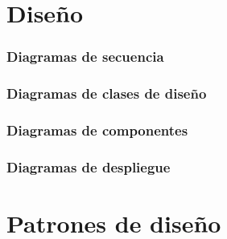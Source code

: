 \documentclass[spanish,a4paper,11pt, twoside]{report}	%
\begin{document}
\setcounter{section}{0}
\part{Diseño}
	\section{Diagramas de secuencia}


	\section{Diagramas de clases de diseño}


	\section{Diagramas de componentes}


	\section{Diagramas de despliegue}






\setcounter{section}{0}
\part{Patrones de diseño}



\newpage
\mbox{}
\thispagestyle{empty}						%
\newpage
\end{document}
